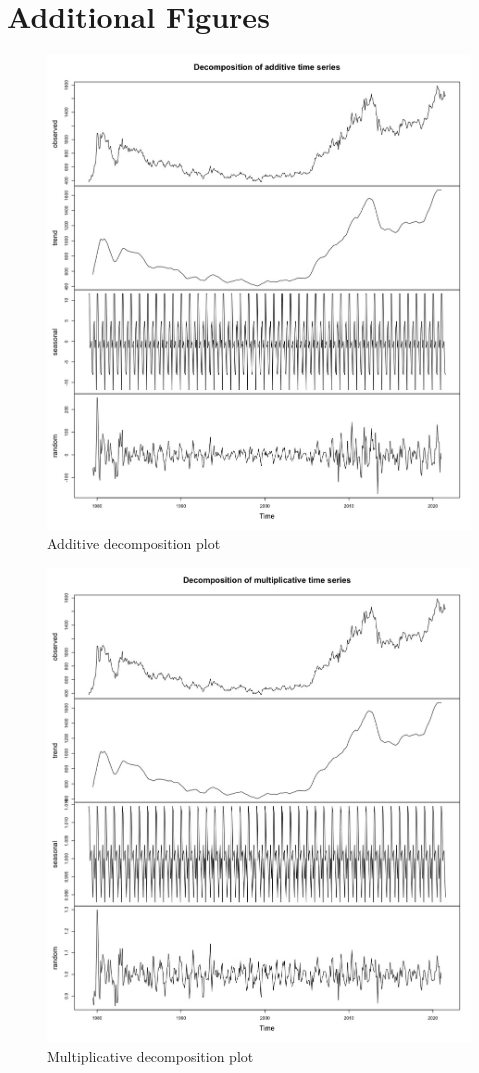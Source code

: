 \documentclass[paper=letter, fontsize=11pt]{scrartcl}
\begin{document}
\section{Additional Figures}
\begin{figure}[H]
    \centering
    \includegraphics[width=0.75\linewidth]{Image/decompse-add.jpeg}
    \caption{Additive decomposition plot}
    \label{fig:decom-add}
\end{figure}
\begin{figure}[H]
    \centering
    \includegraphics[width=0.75\linewidth]{Image/decompose-mult.jpeg}
    \caption{Multiplicative decomposition plot}
    \label{fig:decom-mult}
\end{figure}
\end{document}
